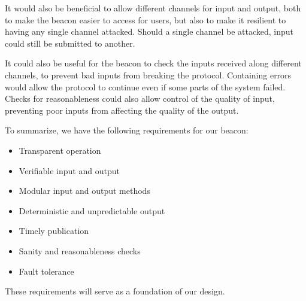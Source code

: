 It would also be beneficial to allow different channels for input and output, both to make the beacon easier to access for users, but also to make it resilient to having any single channel attacked.
Should a single channel be attacked, input could still be submitted to another.

It could also be useful for the beacon to check the inputs received along different channels, to prevent bad inputs from breaking the protocol.
Containing errors would allow the protocol to continue even if some parts of the system failed.
Checks for reasonableness could also allow control of the quality of input, preventing poor inputs from affecting the quality of the output.

To summarize, we have the following requirements for our beacon:
\begin{itemize}
    \setlength\itemsep{0em}
    \item Transparent operation
    \item Verifiable input and output
    \item Modular input and output methods
    \item Deterministic and unpredictable output
    \item Timely publication
    \item Sanity and reasonableness checks
    \item Fault tolerance
\end{itemize}

These requirements will serve as a foundation of our design.

